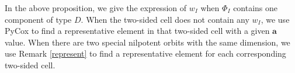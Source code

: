 \documentclass[reqno,12pt]{amsart}
\numberwithin{equation}{section}
\theoremstyle{plain}
\newtheorem{Lem}[Thm]{Lemma}
\theoremstyle{definition}
\newcommand{\aff}{ \mathbf{a} }
\begin{document}
In the above proposition, we give the expression of $w_I$ when $\Phi_I $ contains one component of type $D$. When the two-sided cell does not contain any $w_I$, we use PyCox to find a representative element in that two-sided cell with  a given $\aff$ value. When there are two special nilpotent orbits with the same dimension, we use Remark \ref{represent} to find  a
representative element for each corresponding two-sided cell.










 
  








\end{document}
